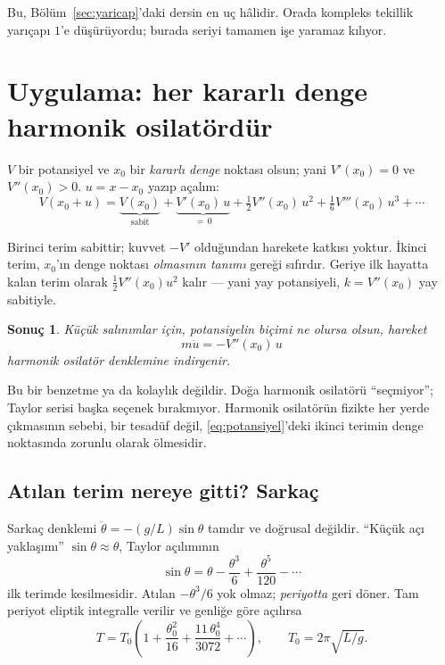 \documentclass[11pt,a4paper]{article}
\theoremstyle{plain}
\newtheorem{sonuc}[teorem]{Sonuç}
\theoremstyle{definition}
\theoremstyle{remark}
\begin{document}
Bu, Bölüm~\ref{sec:yaricap}'daki dersin en uç hâlidir. Orada kompleks
tekillik yarıçapı $1$'e düşürüyordu; burada seriyi tamamen işe yaramaz kılıyor.

\section{Uygulama: her kararlı denge harmonik osilatördür}

$V$ bir potansiyel ve $x_0$ bir \emph{kararlı denge} noktası olsun; yani
$V'(x_0) = 0$ ve $V''(x_0) > 0$. $u = x - x_0$ yazıp açalım:
\begin{equation}\label{eq:potansiyel}
  V(x_0+u) = \underbrace{V(x_0)}_{\text{sabit}}
  + \underbrace{V'(x_0)\,u}_{=\,0}
  + \tfrac12 V''(x_0)\,u^2
  + \tfrac16 V'''(x_0)\,u^3 + \cdots
\end{equation}

Birinci terim sabittir; kuvvet $-V'$ olduğundan harekete katkısı yoktur.
İkinci terim, $x_0$'ın denge noktası \emph{olmasının tanımı} gereği sıfırdır.
Geriye ilk hayatta kalan terim olarak $\tfrac12 V''(x_0)u^2$ kalır --- yani
yay potansiyeli, $k = V''(x_0)$ yay sabitiyle.

\begin{sonuc}
Küçük salınımlar için, potansiyelin biçimi ne olursa olsun, hareket
\[
  m\ddot{u} = -V''(x_0)\,u
\]
harmonik osilatör denklemine indirgenir.
\end{sonuc}

Bu bir benzetme ya da kolaylık değildir. Doğa harmonik osilatörü
``seçmiyor''; Taylor serisi başka seçenek bırakmıyor. Harmonik osilatörün
fizikte her yerde çıkmasının sebebi, bir tesadüf değil,
\eqref{eq:potansiyel}'deki ikinci terimin denge noktasında zorunlu olarak
ölmesidir.

\subsection*{Atılan terim nereye gitti? Sarkaç}

Sarkaç denklemi $\ddot\theta = -(g/L)\sin\theta$ tamdır ve doğrusal değildir.
``Küçük açı yaklaşımı'' $\sin\theta \approx \theta$, Taylor açılımının
\[
  \sin\theta = \theta - \frac{\theta^3}{6} + \frac{\theta^5}{120} - \cdots
\]
ilk terimde kesilmesidir. Atılan $-\theta^3/6$ yok olmaz; \emph{periyotta}
geri döner. Tam periyot eliptik integralle verilir ve genliğe göre açılırsa
\begin{equation}\label{eq:periyot}
  T = T_0\left(1 + \frac{\theta_0^2}{16}
  + \frac{11\,\theta_0^4}{3072} + \cdots\right),
  \qquad T_0 = 2\pi\sqrt{L/g}.
\end{equation}
\end{document}
